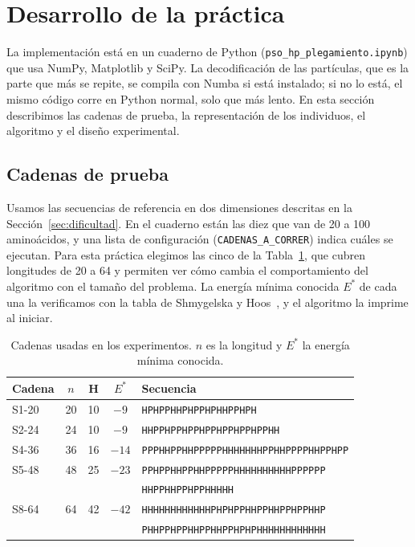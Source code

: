 \section{Desarrollo de la práctica}
\label{sec:desarrollo}

La implementación está en un cuaderno de Python (\texttt{pso\_hp\_plegamiento.ipynb}) que usa NumPy, Matplotlib y SciPy. La decodificación de las partículas, que es la parte que más se repite, se compila con Numba si está instalado; si no lo está, el mismo código corre en Python normal, solo que más lento. En esta sección describimos las cadenas de prueba, la representación de los individuos, el algoritmo y el diseño experimental.

\subsection{Cadenas de prueba}
\label{sec:cadenas}

Usamos las secuencias de referencia en dos dimensiones descritas en la Sección~\ref{sec:dificultad}. En el cuaderno están las diez que van de 20 a 100 aminoácidos, y una lista de configuración (\texttt{CADENAS\_A\_CORRER}) indica cuáles se ejecutan. Para esta práctica elegimos las cinco de la Tabla~\ref{tab:cadenas}, que cubren longitudes de 20 a 64 y permiten ver cómo cambia el comportamiento del algoritmo con el tamaño del problema. La energía mínima conocida $E^*$ de cada una la verificamos con la tabla de Shmygelska y Hoos~\cite{shmygelska2005ant}, y el algoritmo la imprime al iniciar.

\begin{table}[H]
\centering
\caption{Cadenas usadas en los experimentos. $n$ es la longitud y $E^*$ la energía mínima conocida.}
\label{tab:cadenas}
\small
\begin{tabular}{lcccl}
\toprule
Cadena & $n$ & H & $E^*$ & Secuencia \\
\midrule
S1-20 & 20 & 10 & $-9$  & \texttt{HPHPPHHPHPPHPHHPPHPH} \\
S2-24 & 24 & 10 & $-9$  & \texttt{HHPPHPPHPPHPPHPPHPPHPPHH} \\
S4-36 & 36 & 16 & $-14$ & \texttt{PPPHHPPHHPPPPPHHHHHHHPPHHPPPPHHPPHPP} \\
S5-48 & 48 & 25 & $-23$ & \texttt{PPHPPHHPPHHPPPPPHHHHHHHHHHPPPPPP} \\
      &    &    &       & \texttt{HHPPHHPPHPPHHHHH} \\
S8-64 & 64 & 42 & $-42$ & \texttt{HHHHHHHHHHHHPHPHPPHHPPHHPPHPPHHP} \\
      &    &    &       & \texttt{PHHPPHPPHHPPHHPPHPHPHHHHHHHHHHHH} \\
\bottomrule
\end{tabular}
\end{table}

